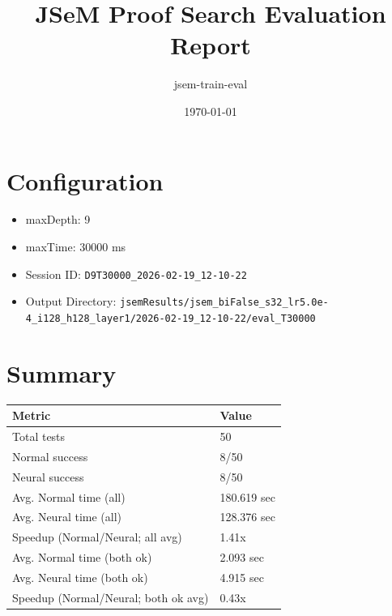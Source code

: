 \documentclass[a4paper,10pt]{article}
\title{JSeM Proof Search Evaluation Report}
\author{jsem-train-eval}
\date{\today}
\begin{document}
\maketitle

\section{Configuration}
\begin{itemize}
\item maxDepth: 9
\item maxTime: 30000 ms
\item Session ID: \texttt{D9T30000\_2026-02-19\_12-10-22}
\item Output Directory: \texttt{jsemResults/jsem\_biFalse\_s32\_lr5.0e-4\_i128\_h128\_layer1/2026-02-19\_12-10-22/eval\_T30000}
\end{itemize}

\section{Summary}
\begin{tabular}{ll}
\toprule
\textbf{Metric} & \textbf{Value} \\
\midrule
Total tests & 50 \\
Normal success & 8/50 \\
Neural success & 8/50 \\
\midrule
Avg. Normal time (all) & 180.619 sec \\
Avg. Neural time (all) & 128.376 sec \\
Speedup (Normal/Neural; all avg) & 1.41x \\
Avg. Normal time (both ok) & 2.093 sec \\
Avg. Neural time (both ok) & 4.915 sec \\
Speedup (Normal/Neural; both ok avg) & 0.43x \\
\bottomrule
\end{tabular}
\end{document}
